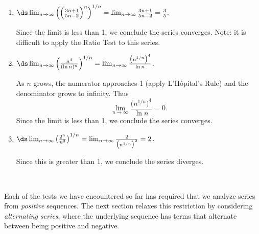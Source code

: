 {\begin{enumerate}
	\item $\ds\lim_{n\to\infty} \left(\left(\frac{3n+1}{5n-2}\right)^n\right)^{1/n} = \lim_{n\to\infty} \frac{3n+1}{5n-2} = \frac 35.$ 
	
	Since the limit is less than 1, we conclude the series converges. Note: it is difficult to apply the Ratio Test to this series.
	
	\item		$\ds\lim_{n\to\infty} \left(\frac{n^4}{(\ln n)^n}\right)^{1/n} = \lim_{n\to\infty} \frac {\big(n^{1/n}\big)^4}{\ln n}  $. 
	
	As $n$ grows, the numerator approaches 1 (apply L'H\^opital's Rule) and the denominator 
	grows to infinity.  Thus $$ \lim_{n\to\infty} \frac{\big(n^{1/n}\big)^4}{\ln n} = 0.$$ Since the limit is less than 1, we conclude the series converges.
	
	\item		$\ds \lim_{n\to\infty} \left(\frac{2^n}{n^2}\right)^{1/n} = \lim_{n\to\infty} \frac{2}{\big(n^{1/n}\big)^2} = 2$. 
	
	Since this is greater than 1, we conclude the series diverges.
\end{enumerate}
\baselineskip
}\\
\enlargethispage{\baselineskip}

Each of the tests we have encountered so far has required that we analyze series from \emph{positive} sequences. The next section relaxes this restriction by  considering \emph{alternating series}, where the underlying sequence has terms that alternate between being positive and negative.



